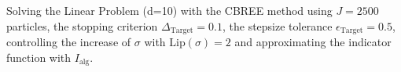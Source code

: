 Solving the Linear Problem (d=10) with the CBREE method using  $J = 2500$ particles, the stopping criterion $\Delta_{\text{Target}} = 0.1$, the stepsize tolerance $\epsilon_{\text{Target}} = 0.5$, controlling the increase of $\sigma$ with $\text{Lip}(\sigma) = 2$ and approximating the indicator function with $I_\text{alg}$.